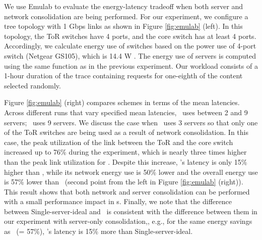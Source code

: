 We use Emulab to evaluate the energy-latency tradeoff when both server and network consolidation are being performed. For our experiment, we configure a tree topology with 1 Gbps links as shown in Figure \ref{fig:emulab} (left). 
In this topology, the ToR switches have 4 ports, and the core switch has at least 4 ports. Accordingly,  we calculate energy use of switches based on the power use of 4-port switch (Netgear GS105), which is 14.4 W \cite{netgearGS105}. The energy use of servers is computed using the same function as in the previous experiment. Our workload consists of a 1-hour duration of the trace containing requests for one-eighth of the content selected randomly.

Figure \ref{fig:emulab} (right) compares schemes in terms of the mean latencies.  Across different runs that vary specified mean latencies, \shrink\ uses between 2 and 9 servers; \peakS\ uses 9 servers.  We discuss the case when \shrink\ uses 3 servers so that only one of the ToR switches are being used as a result of network consolidation. In this case, the peak utilization of the link between the ToR and the core switch increased up to 76\% during the experiment, which is nearly three times higher than the peak link utilization for \peakS. Despite this increase, \shrink's latency is only 15\% higher than \peakS, while its network energy use is 50\% lower and the overall energy use is 57\% lower than \peakS\ (second point from the left in Figure \ref{fig:emulab} (right)). This result shows that both network and server consolidation can be performed with a small performance impact in \cdc s. Finally, we note that the difference between Single-server-ideal and \shrink\ is consistent with the difference between them in our experiment with server-only consolidation,, e.g., for the same energy savings as \shrink\ (= 57\%), \shrink's latency is 15\% more than Single-server-ideal.



